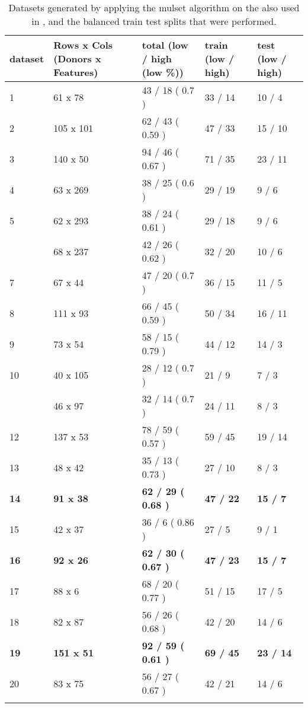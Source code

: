\begin{table}[htpb]
    \begin{tabularx}{\textwidth}{XXXXX}
\toprule{}
        dataset & Rows x Cols (Donors x Features) & total (low / high (low \%)) & train (low / high) & test (low / high)\\
\midrule{}
1 & 61 x 78 & 43 / 18 ( 0.7 ) & 33 / 14 & 10 / 4\\
2 & 105 x 101 & 62 / 43 ( 0.59 ) & 47 / 33 & 15 / 10\\
3 & 140 x 50 & 94 / 46 ( 0.67 ) & 71 / 35 & 23 / 11\\
4 & 63 x 269 & 38 / 25 ( 0.6 ) & 29 / 19 & 9 / 6\\
5 & 62 x 293 & 38 / 24 ( 0.61 ) & 29 / 18 & 9 / 6\\
\addlinespace
6 & 68 x 237 & 42 / 26 ( 0.62 ) & 32 / 20 & 10 / 6\\
7 & 67 x 44 & 47 / 20 ( 0.7 ) & 36 / 15 & 11 / 5\\
8 & 111 x 93 & 66 / 45 ( 0.59 ) & 50 / 34 & 16 / 11\\
9 & 73 x 54 & 58 / 15 ( 0.79 ) & 44 / 12 & 14 / 3\\
10 & 40 x 105 & 28 / 12 ( 0.7 ) & 21 / 9 & 7 / 3\\
\addlinespace
11 & 46 x 97 & 32 / 14 ( 0.7 ) & 24 / 11 & 8 / 3\\
12 & 137 x 53 & 78 / 59 ( 0.57 ) & 59 / 45 & 19 / 14\\
13 & 48 x 42 & 35 / 13 ( 0.73 ) & 27 / 10 & 8 / 3\\
\textbf{14} & \textbf{91 x 38} & \textbf{62 / 29 ( 0.68 )} & \textbf{47 / 22} & \textbf{15 / 7}\\
15 & 42 x 37 & 36 / 6 ( 0.86 ) & 27 / 5 & 9 / 1\\
\addlinespace
\textbf{16} & \textbf{92 x 26} & \textbf{62 / 30 ( 0.67 )} & \textbf{47 / 23} & \textbf{15 / 7}\\
17 & 88 x 6 & 68 / 20 ( 0.77 ) & 51 / 15 & 17 / 5\\
18 & 82 x 87 & 56 / 26 ( 0.68 ) & 42 / 20 & 14 / 6\\
\textbf{19} & \textbf{151 x 51} & \textbf{92 / 59 ( 0.61 )} & \textbf{69 / 45} & \textbf{23 / 14}\\
20 & 83 x 75 & 56 / 27 ( 0.67 ) & 42 / 21 & 14 / 6\\
\bottomrule{}
\end{tabularx}
    \caption{
        Datasets generated by applying the mulset algorithm on the \firstvis also used in \spaper, and the balanced train test splits that were performed.
    }\label{tbl:mulsetDatasets}
\end{table}

